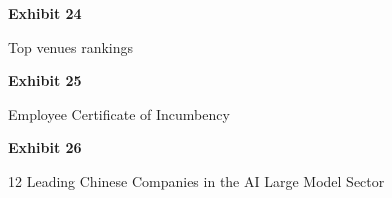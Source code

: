\documentclass{article}
\begin{document}
  
  
 
 



\vspace*{\fill}
\begin{center}
{\LARGE \bf
Exhibit 24
}

\vspace{10\baselineskip}

{\large Top venues rankings}

\end{center}
\vspace*{\fill}


% 

% 

% 

% 



\vspace*{\fill}
\begin{center}
{\LARGE \bf
Exhibit 25
}

\vspace{10\baselineskip}

{\large Employee Certificate of Incumbency}

\end{center}
\vspace*{\fill}

%




\vspace*{\fill}
\begin{center}
{\LARGE \bf
Exhibit 26
}

\vspace{10\baselineskip}

{\large 12 Leading Chinese Companies in the AI Large Model Sector}

\end{center}
\vspace*{\fill}
\end{document}
